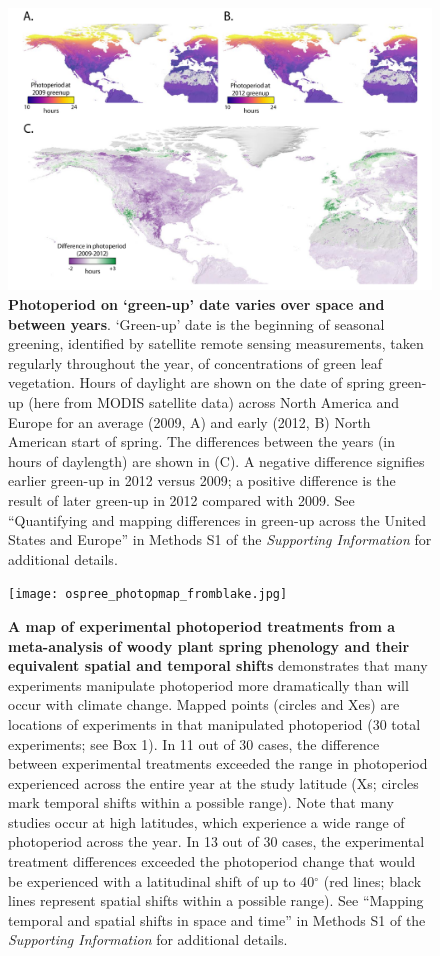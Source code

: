\documentclass{article}
\begin{document}
 \begin{figure}[h]
\centering
\includegraphics{Greenup_corr_sm_leg.pdf} %
\caption{\textbf{Photoperiod on `green-up' date varies over space and between years}. `Green-up' date is the beginning of seasonal greening, identified by satellite remote sensing measurements, taken regularly throughout the year, of concentrations of green leaf vegetation. Hours of daylight are shown on the date of spring green-up (here from MODIS satellite data) across North America and Europe for an average (2009, A) and early (2012, B) North American start of spring. The differences between the years (in hours of daylength) are shown in (C). A negative difference signifies earlier green-up in 2012 versus 2009; a positive difference is the result of later green-up in 2012 compared with 2009. See ``Quantifying and mapping differences in green-up across the United States and Europe'' in Methods S1 of the \emph{Supporting Information} for additional details. }%
 \label{fig:greenup}%
 \end{figure}

\begin{figure}[h]
\centering
\texttt{[image: ospree\_photopmap\_fromblake.jpg]} 
\caption{\textbf{A map of experimental photoperiod treatments from a meta-analysis of woody plant spring phenology and their equivalent spatial and temporal shifts} demonstrates that many experiments manipulate photoperiod more dramatically than will occur with climate change. Mapped points (circles and Xes) are locations of experiments in \citet{wolkovich2019} that manipulated photoperiod (30 total experiments; see Box 1). In 11 out of 30 cases, the difference between experimental treatments exceeded the range in photoperiod experienced across the entire year at the study latitude (Xs; circles mark temporal shifts within a possible range). Note that many studies occur at high latitudes, which experience a wide range of photoperiod across the year. In 13 out of 30 cases, the experimental treatment differences exceeded the photoperiod change that would be experienced with a latitudinal shift of up to 40$^{\circ}$ (red lines; black lines represent spatial shifts within a possible range). See ``Mapping temporal and spatial shifts in space and time'' in Methods S1 of the \emph{Supporting Information} for additional details. }
 \label{fig:photomap}
 \end{figure}
\end{document}

